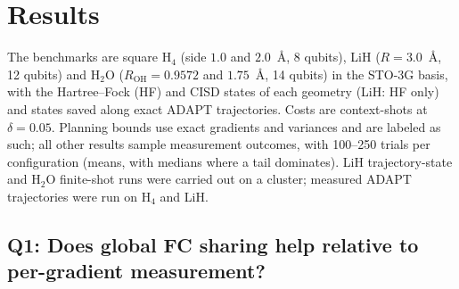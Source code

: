 \documentclass[aps,pra,reprint,superscriptaddress,nofootinbib]{revtex4-2}
\begin{document}

\section{Results}

The benchmarks are square H$_4$ (side $1.0$ and $2.0$~\AA, 8 qubits), LiH ($R=3.0$~\AA, 12 qubits) and H$_2$O ($R_{\mathrm{OH}}=0.9572$ and $1.75$~\AA, 14 qubits) in the STO-3G basis, with the Hartree--Fock (HF) and CISD states of each geometry (LiH: HF only) and states saved along exact ADAPT trajectories. Costs are context-shots at $\delta=0.05$. Planning bounds use exact gradients and variances and are labeled as such; all other results sample measurement outcomes, with 100--250 trials per configuration (means, with medians where a tail dominates). LiH trajectory-state and H$_2$O finite-shot runs were carried out on a cluster; measured ADAPT trajectories were run on H$_4$ and LiH.

\subsection{Q1: Does global FC sharing help relative to per-gradient measurement?}
\end{document}
